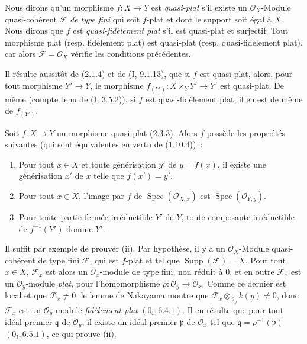 \begin{env}[2.3.3]
\label{IV.2.3.3-fr}
Nous dirons qu'un morphisme $f:X\to Y$ est \emph{quasi-plat} s'il existe un
$\mathcal O_X$-Module quasi-cohérent $\mathscr F$ \emph{de type fini} qui soit
$f$-plat et dont le support soit égal à $X$. Nous dirons que $f$ est
\emph{quasi-fidèlement plat} s'il est quasi-plat et surjectif. Tout morphisme
plat (resp. fidèlement plat) est quasi-plat (resp. quasi-fidèlement plat), car
alors $\mathscr F=\mathcal O_X$ vérifie les conditions précédentes.
\end{env}

Il résulte aussitôt de (2.1.4) et de (I, 9.1.13), que si $f$ est quasi-plat,
alors, pour tout morphisme $Y'\to Y$, le morphisme
$f_{(Y')}:X\times_Y Y'\to Y'$ est quasi-plat. De même (compte tenu de
(I, 3.5.2)), si $f$ est quasi-fidèlement plat, il en est de même de
$f_{(Y')}$.

\begin{proposition}[2.3.4]
\label{IV.2.3.4-fr}
Soit $f:X\to Y$ un morphisme quasi-plat (2.3.3). Alors $f$ possède les
propriétés suivantes (qui sont équivalentes en vertu de (1.10.4))~:
\begin{enumerate}
  \item[(i)] Pour tout $x\in X$ et toute générisation $y'$ de $y=f(x)$, il
  existe une générisation $x'$ de $x$ telle que $f(x')=y'$.
  \item[(ii)] Pour tout $x\in X$, l'image par $f$ de
  $\operatorname{Spec}(\mathcal O_{X,x})$ est
  $\operatorname{Spec}(\mathcal O_{Y,y})$.
  \item[(iii)] Pour toute partie fermée irréductible $Y'$ de $Y$, toute
  composante irréductible de $f^{-1}(Y')$ domine $Y'$.
\end{enumerate}
\end{proposition}

Il suffit par exemple de prouver (ii). Par hypothèse, il y a un
$\mathcal O_X$-Module quasi-cohérent de type fini $\mathscr F$, qui est
$f$-plat et tel que $\operatorname{Supp}(\mathscr F)=X$. Pour tout $x\in X$,
$\mathscr F_x$ est alors un $\mathcal O_x$-module de type fini, non réduit à
0, et en outre $\mathscr F_x$ est un $\mathcal O_y$-module \emph{plat}, pour
l'homomorphisme $\rho:\mathcal O_y\to\mathcal O_x$. Comme ce dernier est
local et que $\mathscr F_x\neq0$, le lemme de Nakayama montre que
$\mathscr F_x\otimes_{\mathcal O_y}k(y)\neq0$, donc $\mathscr F_x$ est un
$\mathcal O_y$-module \emph{fidèlement plat} $(0_{\mathrm I},6.4.1)$. Il
en résulte que pour tout idéal premier $\mathfrak q$ de $\mathcal O_y$, il
existe un idéal premier $\mathfrak p$ de $\mathcal O_x$ tel que
$\mathfrak q=\rho^{-1}(\mathfrak p)$ $(0_{\mathrm I},6.5.1)$, ce qui
prouve (ii).

